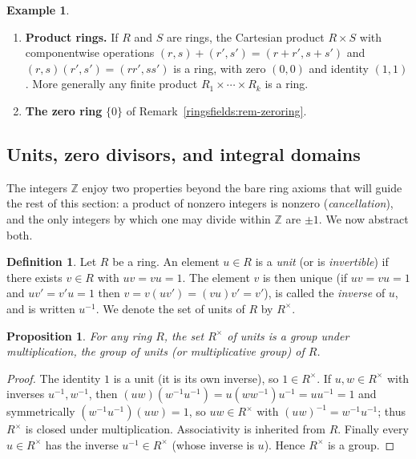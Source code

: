 \documentclass[11pt,a4paper]{article}
\newtheorem{proposition}[theorem]{Proposition}
\theoremstyle{definition}
\newtheorem{definition}[theorem]{Definition}
\newtheorem{example}[theorem]{Example}
\theoremstyle{remark}
\newcommand{\Z}{\ensuremath{\mathbb{Z}}}
\begin{document}
\begin{example}
\begin{enumerate}
\item \textbf{Product rings.} If \(R\) and \(S\) are rings, the Cartesian product \(R\times S\) with componentwise operations \((r,s)+(r',s')=(r+r',s+s')\) and \((r,s)(r',s')=(rr',ss')\) is a ring, with zero \((0,0)\) and identity \((1,1)\). More generally any finite product \(R_1\times\cdots\times R_k\) is a ring.
\item \textbf{The zero ring} \(\{0\}\) of Remark~\ref{ringsfields:rem-zeroring}.
\end{enumerate}
\end{example}

\subsection{Units, zero divisors, and integral domains}\label{ringsfields:subsec-units}

The integers \(\Z\) enjoy two properties beyond the bare ring axioms that will guide the rest of this section: a product of nonzero integers is nonzero (\emph{cancellation}), and the only integers by which one may divide within \(\Z\) are \(\pm 1\). We now abstract both.

\begin{definition}\label{ringsfields:def-unit}
Let \(R\) be a ring. An element \(u\in R\) is a \emph{unit} (or is \emph{invertible}) if there exists \(v\in R\) with \(uv = vu = 1\). The element \(v\) is then unique (if \(uv=vu=1\) and \(uv'=v'u=1\) then \(v = v(uv') = (vu)v' = v'\)), is called the \emph{inverse} of \(u\), and is written \(u^{-1}\). We denote the set of units of \(R\) by \(R^{\times}\).
\end{definition}

\begin{proposition}\label{ringsfields:prop-units-group}
For any ring \(R\), the set \(R^{\times}\) of units is a group under multiplication, the \emph{group of units} (or \emph{multiplicative group}) of \(R\).
\end{proposition}

\begin{proof}
The identity \(1\) is a unit (it is its own inverse), so \(1\in R^{\times}\). If \(u,w\in R^{\times}\) with inverses \(u^{-1},w^{-1}\), then \((uw)(w^{-1}u^{-1}) = u(ww^{-1})u^{-1} = uu^{-1}=1\) and symmetrically \((w^{-1}u^{-1})(uw)=1\), so \(uw\in R^{\times}\) with \((uw)^{-1}=w^{-1}u^{-1}\); thus \(R^{\times}\) is closed under multiplication. Associativity is inherited from \(R\). Finally every \(u\in R^{\times}\) has the inverse \(u^{-1}\in R^{\times}\) (whose inverse is \(u\)). Hence \(R^{\times}\) is a group.
\end{proof}
\end{document}
